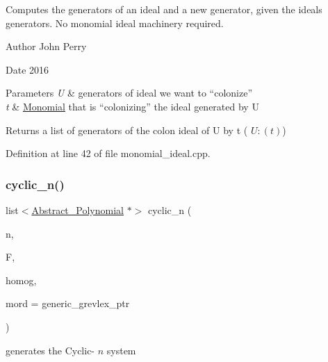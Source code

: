 Computes the generators of an ideal and a new generator, given the ideal\textquotesingle{}s generators. No monomial ideal machinery required. 

\begin{DoxyAuthor}{Author}
John Perry 
\end{DoxyAuthor}
\begin{DoxyDate}{Date}
2016 
\end{DoxyDate}

\begin{DoxyParams}{Parameters}
{\em U} & generators of ideal we want to ``colonize'' \\
\hline
{\em t} & \hyperlink{group__polygroup_class_monomial}{Monomial} that is ``colonizing'' the ideal generated by {\ttfamily U} \\
\hline
\end{DoxyParams}
\begin{DoxyReturn}{Returns}
a list of generators of the colon ideal of {\ttfamily U} by {\ttfamily t} ( $ U:(t) $) 
\end{DoxyReturn}


Definition at line 42 of file monomial\+\_\+ideal.\+cpp.

\mbox{\label{group__polygroup_gaa458dfbf51ecbb98f93bf8f0133725d0}} 
\subsubsection{\texorpdfstring{cyclic\+\_\+n()}{cyclic\_n()}}
{\footnotesize\ttfamily list$<$\hyperlink{group__polygroup_class_abstract___polynomial}{Abstract\+\_\+\+Polynomial} $\ast$$>$ cyclic\+\_\+n (\begin{DoxyParamCaption}\item[{N\+V\+A\+R\+\_\+\+T\+Y\+PE}]{n,  }\item[{\hyperlink{group___fields_group_class_prime___field}{Prime\+\_\+\+Field} \&}]{F,  }\item[{bool}]{homog,  }\item[{\hyperlink{group__orderinggroup_class_monomial___ordering}{Monomial\+\_\+\+Ordering} $\ast$}]{mord = {\ttfamily generic\+\_\+grevlex\+\_\+ptr} }\end{DoxyParamCaption})}



generates the Cyclic-\/ $ n $ system 

